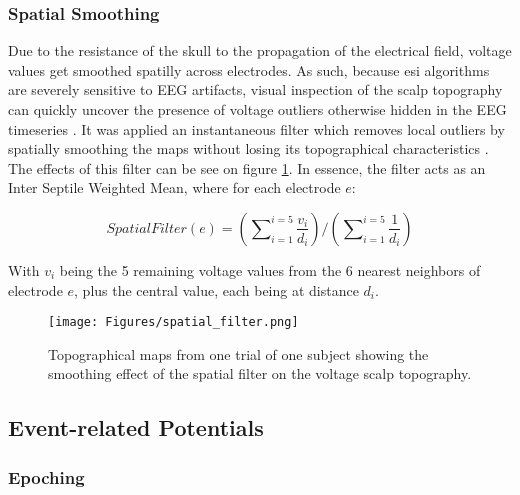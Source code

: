 \subsubsection{Spatial Smoothing}

Due to the resistance of the skull to the propagation of the electrical field, voltage values get smoothed spatilly across electrodes. As such, because \acrshort{esi} algorithms are severely sensitive to EEG artifacts, visual inspection of the scalp topography can quickly uncover the presence of voltage outliers otherwise hidden in the EEG timeseries \cite{michelDataAcquisitionPreprocessing2009}. It was applied an instantaneous filter which removes local outliers by spatially smoothing the maps without losing its topographical characteristics \cite{michelEEGSourceImaging2019}. The effects of this filter can be see on figure \ref{fig:spatial_filter}. In essence, the filter acts as an Inter Septile Weighted Mean, where for each electrode $e$:

\begin{equation}
    S p a t i a l F i l t e r(e)=\left(\sum\nolimits_{i=1}^{i=5}{\frac{v_{i}}{d_{i}}}\right)/\left(\sum\nolimits_{i=1}^{i=5}{\frac{1}{d_{i}}}\right)
\end{equation}

With $v_{i}$ being the 5 remaining voltage values from the 6 nearest neighbors of electrode $e$, plus the central value, each being at distance $d_{i}$.

\begin{figure}[H]
	\centering
	\texttt{[image: Figures/spatial\_filter.png]}
	\caption{Topographical maps from one trial of one subject showing the smoothing effect of the spatial filter on the voltage scalp topography. \label{fig:spatial_filter}}
\end{figure}

\subsection{Event-related Potentials}
\label{section:erps}

\subsubsection{Epoching}

